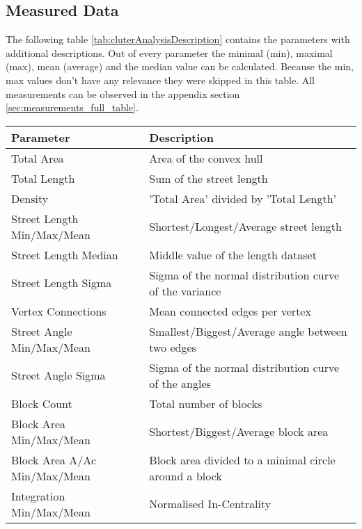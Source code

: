 \FloatBarrier
\subsection{Measured Data}
\label{sec:ClusterAnalysisMeasurements}
The following table \ref{tab:cluterAnalysisDescription} contains the parameters with additional descriptions. Out of every parameter the minimal (min), maximal (max), mean (average) and the median value can be calculated. Because the min, max values don't have any relevance they were skipped in this table. All measurements can be observed in the appendix section \ref{sec:measurements_full_table}.

\begin{table}[!ht]
\centering
\begin{tabular}{ | l | l |} \hline
    \textbf{Parameter} & \textbf{Description} \\
    \hline

    Total Area &  Area of the convex hull \\
    Total Length & Sum of the street length \\
    Density & 'Total Area' divided by 'Total Length' \\
    \hline

    Street Length Min/Max/Mean & Shortest/Longest/Average street length  \\
    Street Length Median & Middle value of the length dataset \\
    Street Length Sigma & Sigma of the normal distribution curve of the variance \\
    \hline

    Vertex Connections & Mean connected edges per vertex  \\
    \hline

    Street Angle Min/Max/Mean & Smallest/Biggest/Average angle between two edges \\
    Street Angle Sigma & Sigma of the normal distribution curve of the angles \\
    \hline

    Block Count & Total number of blocks \\
    Block Area Min/Max/Mean & Shortest/Biggest/Average block area \\
    Block Area A/Ac Min/Max/Mean & Block area divided to a minimal circle around a block \\
    \hline

    Integration Min/Max/Mean & Normalised In-Centrality \\
    \hline


\end{tabular}
\end{table}
